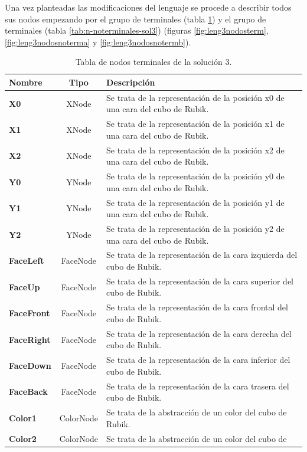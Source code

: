 Una vez planteadas las modificaciones del lenguaje se procede a describir todos 
sus nodos empezando por el grupo de terminales (tabla
\ref{tab:n-terminales-sol3}) y el grupo de terminales (tabla
\ref{tab:n-noterminales-sol3}) (figuras \ref{fig:leng3nodosterm},
\ref{fig:leng3nodosnoterma} y \ref{fig:leng3nodosnotermb}).

\begin{table}[ctb]
\caption{Tabla de nodos terminales de la solución 3.}
\label{tab:n-terminales-sol3}
\centering
\begin{tabular}{lcp{8cm}}
\toprule
\textbf{Nombre} &\textbf{Tipo}& \textbf{Descripción}\\
\midrule
\textbf{X0}&	XNode&	Se trata de la representación de la posición x0 de una cara
del cubo de Rubik.\\\hline
\textbf{X1}&	XNode&	Se trata de la representación de la posición x1 de
una cara del cubo de Rubik.\\\hline
\textbf{X2}&	XNode&	Se trata de la representación de
la posición x2 de una cara del cubo de Rubik.\\\hline
\textbf{Y0}&	YNode&	Se trata de la
representación de la posición y0 de una cara del cubo de Rubik.\\\hline
\textbf{Y1}& YNode&	Se trata de la representación de la posición y1 de una cara
del cubo de Rubik. \\\hline
\textbf{Y2}&	YNode&	Se trata de la representación de la posición y2 de
una cara del cubo de Rubik. \\\hline
\textbf{FaceLeft}&	FaceNode&	Se trata de la
representación de la cara izquierda del cubo de Rubik.\\\hline
\textbf{FaceUp}&	FaceNode&
Se trata de la representación de la cara superior del cubo de Rubik.\\\hline
\textbf{FaceFront}&	FaceNode &	Se trata de la representación de la cara frontal
del cubo de Rubik.\\\hline
\textbf{FaceRight}&	FaceNode&	Se trata de la representación de la cara derecha
del cubo de Rubik.\\\hline
\textbf{FaceDown}&	FaceNode&	Se trata de la representación de la cara inferior
del cubo de Rubik.\\\hline
\textbf{FaceBack}&	FaceNode&	Se trata de la representación de la cara trasera
del cubo de Rubik.\\\hline
\textbf{Color1}&	ColorNode	&Se trata de la abstracción de un color del cubo de
Rubik.\\\hline
\textbf{Color2}&	ColorNode &	Se trata de la abstracción de un color del cubo de

\end{tabular}
\end{table}
